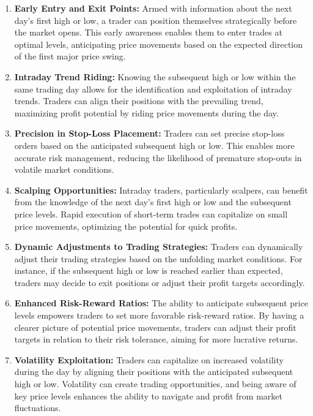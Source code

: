 \documentclass[
  letterpaper,
  DIV=11,
  numbers=noendperiod]{scrreprt}
\begin{document}
\begin{enumerate}
\def\labelenumi{\arabic{enumi}.}
\item
  \textbf{Early Entry and Exit Points:} Armed with information about the
  next day's first high or low, a trader can position themselves
  strategically before the market opens. This early awareness enables
  them to enter trades at optimal levels, anticipating price movements
  based on the expected direction of the first major price swing.
\item
  \textbf{Intraday Trend Riding:} Knowing the subsequent high or low
  within the same trading day allows for the identification and
  exploitation of intraday trends. Traders can align their positions
  with the prevailing trend, maximizing profit potential by riding price
  movements during the day.
\item
  \textbf{Precision in Stop-Loss Placement:} Traders can set precise
  stop-loss orders based on the anticipated subsequent high or low. This
  enables more accurate risk management, reducing the likelihood of
  premature stop-outs in volatile market conditions.
\item
  \textbf{Scalping Opportunities:} Intraday traders, particularly
  scalpers, can benefit from the knowledge of the next day's first high
  or low and the subsequent price levels. Rapid execution of short-term
  trades can capitalize on small price movements, optimizing the
  potential for quick profits.
\item
  \textbf{Dynamic Adjustments to Trading Strategies:} Traders can
  dynamically adjust their trading strategies based on the unfolding
  market conditions. For instance, if the subsequent high or low is
  reached earlier than expected, traders may decide to exit positions or
  adjust their profit targets accordingly.
\item
  \textbf{Enhanced Risk-Reward Ratios:} The ability to anticipate
  subsequent price levels empowers traders to set more favorable
  risk-reward ratios. By having a clearer picture of potential price
  movements, traders can adjust their profit targets in relation to
  their risk tolerance, aiming for more lucrative returns.
\item
  \textbf{Volatility Exploitation:} Traders can capitalize on increased
  volatility during the day by aligning their positions with the
  anticipated subsequent high or low. Volatility can create trading
  opportunities, and being aware of key price levels enhances the
  ability to navigate and profit from market fluctuations.

\end{enumerate}
\end{document}
